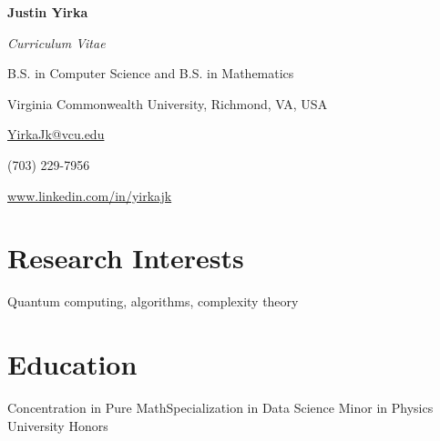 \documentclass[11pt,letterpaper]{moderncv}
\begin{document}
\begin{center}
	{\Large\textbf{Justin Yirka}}
	
	\textit{Curriculum Vitae}
	
	B.S. in Computer Science and B.S. in Mathematics
	
	Virginia Commonwealth University, Richmond, VA, USA
	\vspace{\baselineskip}
	
	\href{mailto:yirkajk@vcu.edu}{YirkaJk@vcu.edu}
	
	(703) 229-7956
	
	\url{www.linkedin.com/in/yirkajk}	
\end{center}


\setlength{\parskip}{0.5em}
\setlength\bibitemsep{\parskip}


\section{Research Interests}
Quantum computing, algorithms, complexity theory


\section{Education}
\vspace{-\baselineskip}\vspace{-\parskip}
{	
	\begin{adjustwidth}{.25in}{}
		Concentration in Pure Math\hspace{2em}Specialization in Data Science \newline
		Minor in Physics \newline
		University Honors
	\end{adjustwidth}
}


\end{document}
